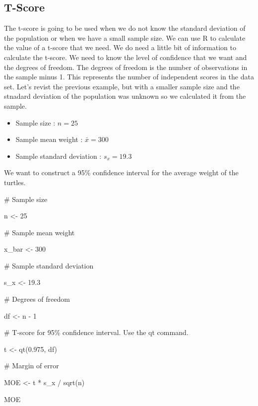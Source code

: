 \documentclass[
  letterpaper,
  DIV=11,
  numbers=noendperiod]{scrreprt}
\newenvironment{Shaded}{\begin{snugshade}}{\end{snugshade}}
\newcommand{\CommentTok}[1]{\textcolor[rgb]{0.37,0.37,0.37}{#1}}
\newcommand{\DecValTok}[1]{\textcolor[rgb]{0.68,0.00,0.00}{#1}}
\newcommand{\FloatTok}[1]{\textcolor[rgb]{0.68,0.00,0.00}{#1}}
\newcommand{\FunctionTok}[1]{\textcolor[rgb]{0.28,0.35,0.67}{#1}}
\newcommand{\NormalTok}[1]{\textcolor[rgb]{0.00,0.23,0.31}{#1}}
\newcommand{\OtherTok}[1]{\textcolor[rgb]{0.00,0.23,0.31}{#1}}
\newcommand{\SpecialCharTok}[1]{\textcolor[rgb]{0.37,0.37,0.37}{#1}}
\providecommand{\tightlist}{%
  \setlength{\itemsep}{0pt}\setlength{\parskip}{0pt}}\usepackage{longtable,booktabs,array}
\begin{document}
\subsection*{T-Score}\label{t-score}

The t-score is going to be used when we do not know the standard
deviation of the population or when we have a small sample size. We can
use R to calculate the value of a t-score that we need. We do need a
little bit of information to calculate the t-score. We need to know the
level of confidence that we want and the degrees of freedom. The degrees
of freedom is the number of observations in the sample minus 1. This
represents the number of independent scores in the data set. Let's
revist the previous example, but with a smaller sample size and the
stnadard deviation of the population was unknown so we calculated it
from the sample.

\begin{itemize}
\tightlist
\item
  Sample size : \(n=25\)
\item
  Sample mean weight : \(\bar{x} = 300\)
\item
  Sample standard deviation : \(s_x = 19.3\)
\end{itemize}

We want to construct a 95\% confidence interval for the average weight
of the turtles.

\begin{Shaded}
\begin{Highlighting}[]
\CommentTok{\# Sample size}

\NormalTok{n }\OtherTok{\textless{}{-}} \DecValTok{25}

\CommentTok{\# Sample mean weight}

\NormalTok{x\_bar }\OtherTok{\textless{}{-}} \DecValTok{300}

\CommentTok{\# Sample standard deviation}

\NormalTok{s\_x }\OtherTok{\textless{}{-}} \FloatTok{19.3}

\CommentTok{\# Degrees of freedom}

\NormalTok{df }\OtherTok{\textless{}{-}}\NormalTok{ n }\SpecialCharTok{{-}} \DecValTok{1}

\CommentTok{\# T{-}score for 95\% confidence interval. Use the qt command.}

\NormalTok{t }\OtherTok{\textless{}{-}} \FunctionTok{qt}\NormalTok{(}\FloatTok{0.975}\NormalTok{, df)}

\CommentTok{\# Margin of error}

\NormalTok{MOE }\OtherTok{\textless{}{-}}\NormalTok{ t }\SpecialCharTok{*}\NormalTok{ s\_x }\SpecialCharTok{/} \FunctionTok{sqrt}\NormalTok{(n)}

\NormalTok{MOE}
\end{Highlighting}
\end{Shaded}
\end{document}
